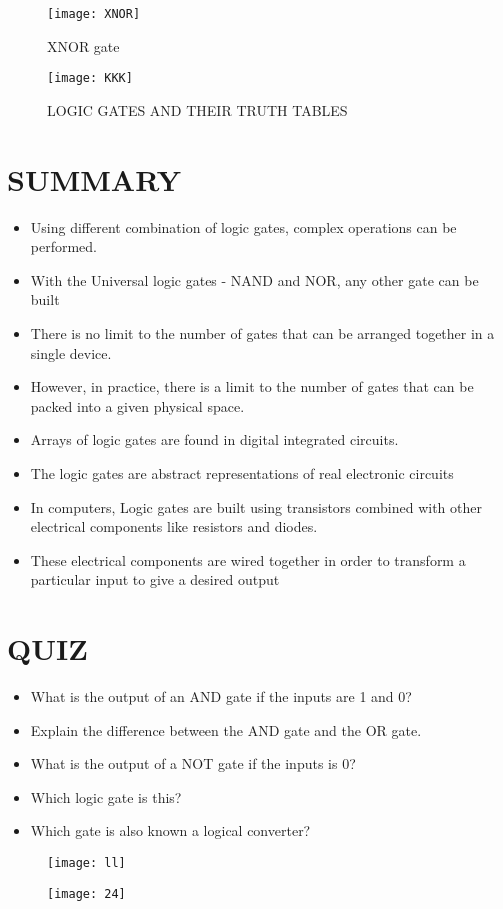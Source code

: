 \documentclass{article}
\begin{document}
\begin{figure}[h!]
	\texttt{[image: XNOR]}
	\caption{XNOR gate}
\end{figure}
\begin{figure}[h!]
	\texttt{[image: KKK]}
	\caption{LOGIC GATES AND THEIR TRUTH TABLES}
\end{figure}
	\section{SUMMARY}
	\begin{itemize}
		\item Using different combination of logic gates, complex operations can be performed. 
		\item With the Universal logic gates - NAND and NOR, any other gate can be built
		\item There is no limit to the number of gates that can be arranged together in a single device.  
		\item However, in practice, there is a limit to the number of gates that can be packed into a given physical space. 
		\item Arrays of logic gates are found in digital integrated circuits.
		\item The logic gates are abstract representations of real electronic circuits
		\item In computers, Logic gates are built using transistors combined with other electrical components like resistors and diodes. 
		\item These electrical components are wired together in order to transform a particular input to give a desired output
		
	\end{itemize}
\section{QUIZ}
\begin{itemize}
	\item What is the output of an AND gate if the inputs are 1 and 0?
	\item Explain the difference between the AND gate and the OR gate.
	\item What is the output of a NOT gate if the inputs is 0?
	\item Which logic gate is this?
	\item Which gate is also known 
	a logical converter?
	
\end{itemize}
\begin{figure}[h!]
	\texttt{[image: ll]}

\end{figure}


\begin{figure}[h!]
\texttt{[image: 24]}

\end{figure}
	
\end{document}
